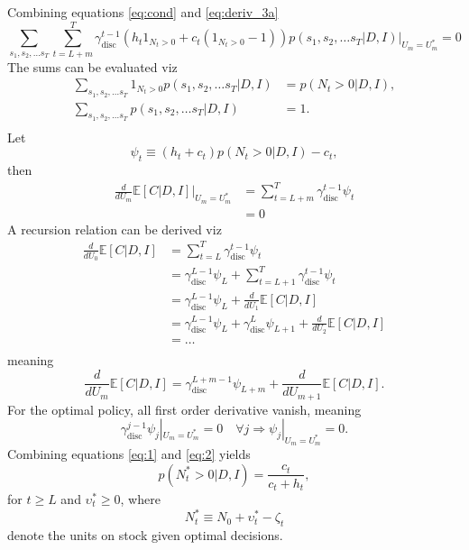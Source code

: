 Combining equations \eqref{eq:cond} and \eqref{eq:deriv_3a}
\begin{equation}
	\sum_{s_1,s_2,\dots s_T}\sum_{t=L+m}^{T}\gamma_{\text{disc}}^{t-1}(h_t1_{N_{t}> 0}+c_t(1_{N_{t}> 0}-1))p(s_1,s_{2},\dots s_T|D,I)\Big|_{U_m=U_m^*} = 0
\end{equation}
The sums can be evaluated viz
\begin{equation}
	\begin{split}
		\sum_{s_1,s_2,\dots s_T}1_{N_{t}> 0}p(s_1,s_{2},\dots s_T|D,I) &= p(N_t> 0|D,I),\\
		\sum_{s_1,s_2,\dots s_T}p(s_1,s_{2},\dots s_T|D,I)&=1.\\
	\end{split}
\end{equation}
Let
\begin{equation}
	\psi_t\equiv (h_t+c_t)p(N_t> 0|D,I)-c_t,
	\label{eq:2}
\end{equation} 
then
\begin{equation}
	\begin{split}
		\frac{d}{dU_m}\mathbb{E}[C|D,I]\Big|_{U_m=U_m^*}& = \sum_{t=L+m}^{T}\gamma_{\text{disc}}^{t-1}\psi_t\\
		&= 0
	\end{split}
\end{equation}
A recursion relation can be derived viz
\begin{equation}
	\begin{split}
		\frac{d}{dU_0}\mathbb{E}[C|D,I]& = \sum_{t=L}^{T}\gamma_{\text{disc}}^{t-1}\psi_t\\
		& =\gamma_{\text{disc}}^{L-1}\psi_L+\sum_{t=L+1}^{T}\gamma_{\text{disc}}^{t-1}\psi_t\\
		& =\gamma_{\text{disc}}^{L-1}\psi_L+\frac{d}{dU_1}\mathbb{E}[C|D,I]\\
		& =\gamma_{\text{disc}}^{L-1}\psi_L+\gamma_{\text{disc}}^{L}\psi_{L+1}+\frac{d}{dU_2}\mathbb{E}[C|D,I]\\
		&=\dots\\
	\end{split} 
\end{equation}
meaning
\begin{equation}
		\frac{d}{dU_m}\mathbb{E}[C|D,I] =\gamma_{\text{disc}}^{L+m-1}\psi_{L+m}+\frac{d}{dU_{m+1}}\mathbb{E}[C|D,I]. 
\end{equation}
For the optimal policy, all first order derivative vanish, meaning
\begin{equation}
	\gamma_{\text{disc}}^{j-1}\psi_j|_{U_m=U_m^*}= 0\quad \forall j \Rightarrow \psi_j|_{U_m=U_m^*}=0.
	\label{eq:1}
\end{equation}
Combining equations \eqref{eq:1} and \eqref{eq:2} yields
\begin{equation}
	p(N_t^*> 0|D,I)=\frac{c_t}{c_t+h_t},
	\label{decision_rules}
\end{equation}
for $t\geq L$ and $\upsilon_t^*\geq 0$, where
\begin{equation}
	N_t^*\equiv N_0+\upsilon_t^*-\zeta_t
\end{equation}
denote the units on stock given optimal decisions.

